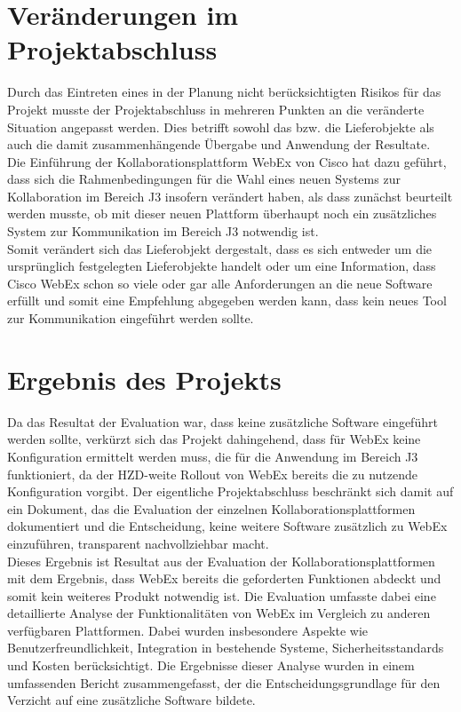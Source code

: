 \documentclass{article}
\begin{document}
	\section{Veränderungen im Projektabschluss}
	Durch das Eintreten eines in der Planung nicht berücksichtigten Risikos für das Projekt musste der Projektabschluss in mehreren Punkten an die veränderte Situation angepasst werden. Dies betrifft sowohl das bzw. die Lieferobjekte als auch die damit zusammenhängende Übergabe und Anwendung der Resultate.\\
	Die Einführung der Kollaborationsplattform WebEx von Cisco hat dazu geführt, dass sich die Rahmenbedingungen für die Wahl eines neuen Systems zur Kollaboration im Bereich J3 insofern verändert haben, als dass zunächst beurteilt werden musste, ob mit dieser neuen Plattform überhaupt noch ein zusätzliches System zur Kommunikation im Bereich J3 notwendig ist. \\
	Somit verändert sich das Lieferobjekt dergestalt, dass es sich entweder um die ursprünglich festgelegten Lieferobjekte handelt oder um eine Information, dass Cisco WebEx schon so viele oder gar alle Anforderungen an die neue Software erfüllt und somit eine Empfehlung abgegeben werden kann, dass kein neues Tool zur Kommunikation eingeführt werden sollte.\\
	
	\section{Ergebnis des Projekts}
	Da das Resultat der Evaluation war, dass keine zusätzliche Software eingeführt werden sollte, verkürzt sich das Projekt dahingehend, dass für WebEx keine Konfiguration ermittelt werden muss, die für die Anwendung im Bereich J3 funktioniert, da der HZD-weite Rollout von WebEx bereits die zu nutzende Konfiguration vorgibt. Der eigentliche Projektabschluss beschränkt sich damit auf ein Dokument, das die Evaluation der einzelnen Kollaborationsplattformen dokumentiert und die Entscheidung, keine weitere Software zusätzlich zu WebEx einzuführen, transparent nachvollziehbar macht. \\
	Dieses Ergebnis ist Resultat aus der Evaluation der Kollaborationsplattformen mit dem Ergebnis, dass WebEx bereits die geforderten Funktionen abdeckt und somit kein weiteres Produkt notwendig ist. Die Evaluation umfasste dabei eine detaillierte Analyse der Funktionalitäten von WebEx im Vergleich zu anderen verfügbaren Plattformen. Dabei wurden insbesondere Aspekte wie Benutzerfreundlichkeit, Integration in bestehende Systeme, Sicherheitsstandards und Kosten berücksichtigt. Die Ergebnisse dieser Analyse wurden in einem umfassenden Bericht zusammengefasst, der die Entscheidungsgrundlage für den Verzicht auf eine zusätzliche Software bildete. \\
	
\end{document}

